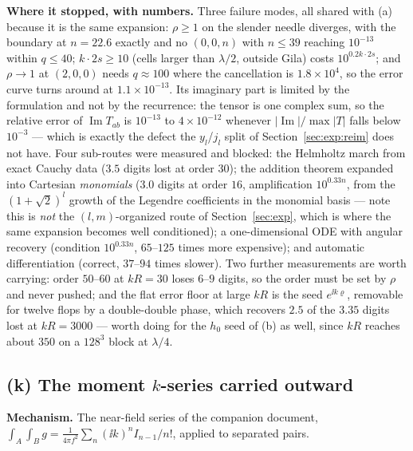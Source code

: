 \textbf{Where it stopped, with numbers.} Three failure modes, all shared with (a) because
it is the same expansion: $\rho \ge 1$ on the slender needle diverges, with the boundary
at $n = 22.6$ exactly and no $(0,0,n)$ with $n \le 39$ reaching $10^{-13}$ within
$q \le 40$; $k\cdot 2s \ge 10$ (cells larger than $\lambda/2$, outside Gila) costs
$10^{0.2k\cdot2s}$; and $\rho \to 1$ at $(2,0,0)$ needs $q \approx 100$ where the
cancellation is $1.8\times10^{4}$, so the error curve turns around at
$1.1\times10^{-13}$. Its imaginary part is limited by the formulation and not by the
recurrence: the tensor is one complex sum, so the relative error of
$\operatorname{Im}T_{ab}$ is $10^{-13}$ to $4\times10^{-12}$ whenever
$|\operatorname{Im}|/\max|T|$ falls below $10^{-3}$ --- which is exactly the defect the
$y_l$/$j_l$ split of Section~\ref{sec:exp:reim} does not have. Four sub-routes were
measured and blocked: the Helmholtz march from exact Cauchy data ($3.5$ digits lost at
order $30$); the addition theorem expanded into Cartesian \emph{monomials} ($3.0$ digits
at order $16$, amplification $10^{0.33n}$, from the $(1+\sqrt2)^l$ growth of the Legendre
coefficients in the monomial basis --- note this is \emph{not} the $(l,m)$-organized
route of Section~\ref{sec:exp}, which is where the same expansion becomes well
conditioned); a one-dimensional ODE with angular recovery (condition $10^{0.33n}$,
$65$--$125$ times more expensive); and automatic differentiation (correct, $37$--$94$
times slower). Two further measurements are worth carrying: order $50$--$60$ at
$kR = 30$ loses $6$--$9$ digits, so the order must be set by $\rho$ and never pushed; and
the flat error floor at large $kR$ is the seed $e^{\ii k\varrho}$, removable for twelve
flops by a double-double phase, which recovers $2.5$ of the $3.35$ digits lost at
$kR = 3000$ --- worth doing for the $h_0$ seed of (b) as well, since $kR$ reaches about
$350$ on a $128^3$ block at $\lambda/4$.

\subsection{\texorpdfstring{(k) The moment $k$-series carried outward}{(k) The moment k-series carried outward}}
\label{sec:reg:k}

\textbf{Mechanism.} The near-field series of the companion document,
$\int_A\int_B g = \frac{1}{4\pi f^2}\sum_n (\ii k)^nI_{n-1}/n!$, applied to separated
pairs.

